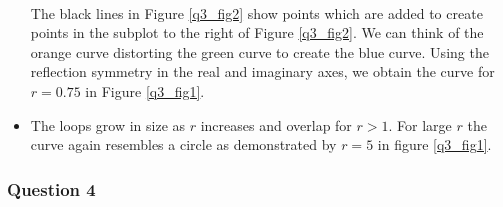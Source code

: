 \documentclass[12pt, a4paper]{article}
\begin{document}
\begin{itemize}[topsep = 8pt, leftmargin = *]
\begin{minipage}{\textwidth}
		\label{q3_fig2}
	\end{minipage}
	\vspace{0.2cm}\\
	The black lines in Figure \ref{q3_fig2} show points which are added to create points in the subplot to the right of Figure \ref{q3_fig2}. We can think of the orange curve distorting the green curve to create the blue curve. Using the reflection symmetry in the real and imaginary axes, we obtain the curve for $r = 0.75$ in Figure \ref{q3_fig1}. 
	\item The loops grow in size as $r$ increases and overlap for $r>1$. For large $r$ the curve again resembles a circle as demonstrated by $r=5$ in figure \ref{q3_fig1}.
\end{itemize}


\subsubsection*{Question 4}
\end{document}
